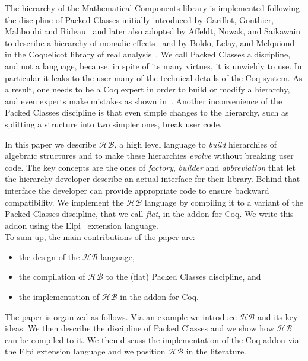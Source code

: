 \documentclass[a4paper,UKenglish,cleveref, autoref]{lipics-v2019}
\newcommand{\HB}{\ensuremath{\mathcal{HB}}}
\newcommand{\hb}{\coq{hierarchy-builder}}
\newcommand{\factory}{factory}
\newcommand{\phantterm}{abbreviation}
\newcommand{\builder}{builder}
\theoremstyle{implem}
\theoremstyle{implem}
\theoremstyle{command}
\begin{document}
The hierarchy of the Mathematical Components library
is implemented following the discipline of Packed Classes initially introduced
by Garillot, Gonthier, Mahboubi and Rideau~\cite{DBLP:conf/tphol/GarillotGMR09}
and later also adopted by Affeldt, Nowak, and Saikawain
to describe a hierarchy of monadic effects~\cite{DBLP:conf/mpc/AffeldtNS19}
and by Boldo, Lelay, and Melquiond in the Coquelicot library of real
analysis~\cite{DBLP:journals/mics/BoldoLM15}.
We call Packed Classes a discipline, and not a language, because, in spite of
its many virtues, it is unwieldy to use. In particular it leaks to the user
many of the technical details of the Coq system. As a result, one
needs to be a Coq expert in order to build or modify a hierarchy, and even
experts make mistakes as shown in~\cite{KSdraft}.
Another inconvenience of the Packed Classes discipline is that even
simple changes to the hierarchy, such as splitting a structure into
two simpler ones, break user code.

In this paper we describe \HB{}, a high level language
to \emph{build} hierarchies of algebraic structures and to make these hierarchies
\emph{evolve} without breaking user code. The key concepts are the ones of
\emph{\factory{}}, \emph{\builder{}} and \emph{\phantterm{}} that let the hierarchy developer describe an actual
interface for their library. Behind that interface the developer can provide
appropriate code to ensure backward compatibility.
We implement the \HB{} language by compiling it
to a variant of the Packed Classes discipline, that we call \emph{flat},
in the \hb{} addon for Coq. We write this addon using the
Elpi~\cite{DBLP:conf/lpar/DunchevGCT15,CoqElpi} extension language.\\

\noindent To sum up, the main contributions of the paper are:
\begin{itemize}
\item the design of the \HB{} language,
\item the compilation of \HB{} to the (flat) Packed Classes discipline, and
\item the implementation of \HB{} in the \hb{} addon for Coq.
\end{itemize}
The paper is organized as follows. Via an example we introduce
\HB{} and its key ideas. %
We then describe the discipline
of Packed Classes and we show how \HB{} can be compiled to it.
We then discuss the implementation of the Coq addon via the Elpi extension
language and we position \HB{} in the literature.
\end{document}
